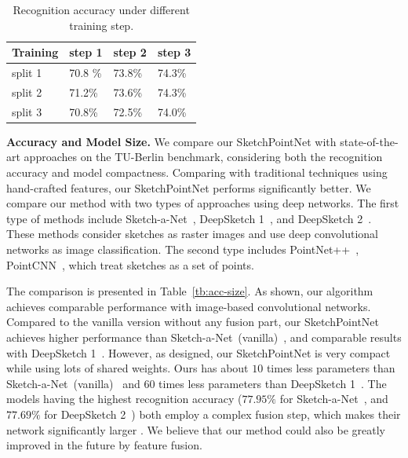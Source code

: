 \begin{table}[htbp]
\centering
\caption{Recognition accuracy under different training step.}
\label{tbl:iteration}
\begin{tabular}{l|lll}
    \hline
     Training& step 1&  step 2& step 3\\
    \hline
     split 1& 70.8 \% & 73.8\% & 74.3\% \\
     split 2& 71.2\% & 73.6\% & 74.3\% \\
     split 3& 70.8\% & 72.5\% & 74.0\% \\
    \hline
\end{tabular}
\end{table}



\noindent\textbf{Accuracy and Model Size.}
%
We compare our SketchPointNet with state-of-the-art approaches on the TU-Berlin benchmark, considering both the recognition accuracy and model compactness.
%
Comparing with traditional techniques using hand-crafted features, our SketchPointNet performs significantly better.
%
We compare our method with two types of approaches using deep networks.
The first type of methods include Sketch-a-Net~\cite{Yu2015SketchaNetTB}, DeepSketch 1~\cite{Seddati2015DeepSketchDC}, and DeepSketch 2~\cite{Dupont2016DeepSketch2D}.
These methods consider sketches as raster images and use deep convolutional networks as image classification.
The second type includes PointNet++~\cite{qi2017pointnetplusplus}, PointCNN~\cite{1801.07791}, which treat sketches as a set of points.


The comparison is presented in Table~\ref{tb:acc-size}.
As shown, our algorithm achieves comparable performance  with image-based convolutional networks.
%
Compared to the vanilla version without any fusion part, our SketchPointNet achieves higher performance than Sketch-a-Net~(vanilla)~\cite{Yu2015SketchaNetTB}, and comparable results with DeepSketch 1~\cite{Seddati2015DeepSketchDC}.
However, as designed, our SketchPointNet is very compact while using lots of shared weights.
Ours has about $10$ times less parameters than Sketch-a-Net~(vanilla)~\cite{Yu2015SketchaNetTB} and $60$ times less parameters than DeepSketch 1~\cite{Seddati2015DeepSketchDC}.
%
The models having the highest recognition accuracy ($77.95\%$ for Sketch-a-Net~\cite{Yu2015SketchaNetTB}, and $77.69\%$ for DeepSketch 2~\cite{Dupont2016DeepSketch2D}) both employ a complex fusion step, which makes their network significantly larger .
%
We believe that our method could also be greatly improved in the future by feature fusion.


